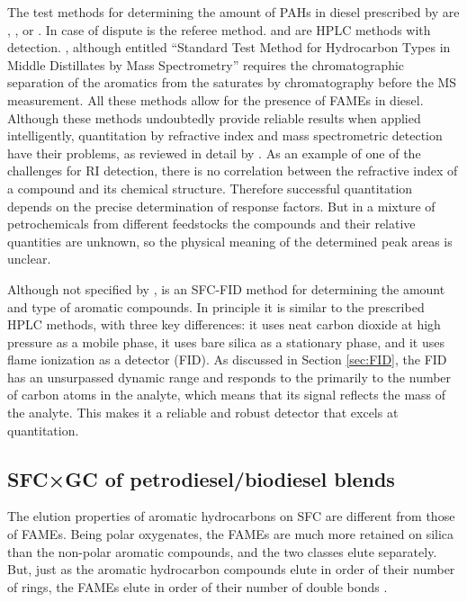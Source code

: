 The test methods for determining the amount of PAHs in diesel prescribed by
 are , , or . In case of
dispute  is the referee method.  and  
are HPLC methods with  detection. ,
although entitled ``Standard Test Method for Hydrocarbon Types in Middle
Distillates by Mass Spectrometry'' requires the chromatographic separation of
the aromatics from the saturates by chromatography before the MS measurement.
All these methods allow for the presence of FAMEs in diesel.
Although these methods undoubtedly provide reliable results when applied
intelligently, quantitation by refractive index and mass spectrometric detection
have their problems, as reviewed in detail by \cite{Kaminski2005}.
As an example of one of the challenges for RI detection, there is no correlation
between the refractive index of a compound and its chemical structure. Therefore
successful quantitation depends on the precise determination of response
factors. But in a mixture of petrochemicals from different feedstocks the
compounds and their relative quantities are unknown, so the physical meaning of
the determined peak areas is unclear.

Although not specified by ,  \autocite{ASTMD5186}
is an SFC-FID method for determining the amount and type of aromatic compounds.
In principle it is similar to the prescribed HPLC methods, with three key
differences: it uses neat carbon dioxide at high pressure as a mobile phase, it
uses bare silica as a stationary phase, and it uses flame ionization as a
detector (FID). As discussed in Section \ref{sec:FID}, the FID has an
unsurpassed dynamic range and responds to the primarily to the number of carbon
atoms in the analyte, which means that its signal reflects the mass of the
analyte. This makes it a reliable and robust detector that excels at
quantitation.

\subsection{SFC×GC of petrodiesel/biodiesel blends}

The elution properties of aromatic hydrocarbons on SFC are different from those
of FAMEs. Being polar oxygenates, the FAMEs are much more retained on silica
than the non-polar aromatic compounds, and the two classes elute separately.
But, just as the aromatic hydrocarbon compounds elute in order of their number
of rings, the FAMEs elute in order of their number of double bonds
\autocite{Smith2001}.

